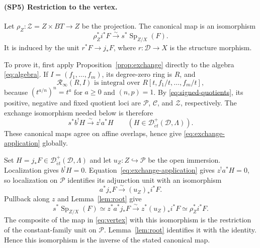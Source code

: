 \documentclass[11pt,a4paper]{article}
\newcommand{\Sp}{\operatorname{Sp}}
\newcommand{\Det}{\mathcal D_{\acute et}}
\newcommand{\cD}{\mathscr D}
\newcommand{\cC}{\mathscr C}
\newcommand{\cP}{\mathscr P}
\newcommand{\cZ}{\mathscr Z}
\newcommand{\Rinf}{\mathcal R_\infty}
\theoremstyle{notes}
\begin{document}
\paragraph{(SP5) Restriction to the vertex.}
Let $\rho_Z:\cZ=Z\times BT\to Z$ be the projection. The canonical map is an isomorphism
\begin{equation}\label{eq:vertex}
\boxed{\ \rho_Z^*i^*F\xrightarrow{\sim}s^*\Sp_{Z/X}(F).\ }
\end{equation}
It is induced by the unit $r^*F\to j_*F$, where $r:\cD\to X$ is the structure morphism.

To prove it, first apply Proposition~\ref{prop:exchange} directly to the algebra \eqref{eq:algebra}. If $I=(f_1,\ldots,f_m)$, its degree-zero ring is $R$, and
\[
\Rinf(R,I)\text{ is integral over }R[t,f_1/t,\ldots,f_m/t],
\]
because $(t^{a/n})^n=t^a$ for $a\geq0$ and $(n,p)=1$. By \eqref{eq:signed-quotients}, its positive, negative and fixed quotient loci are $\cP$, $\cC$, and $\cZ$, respectively. The exchange isomorphism needed below is therefore
\begin{equation}\label{eq:exchange-application}
s^*b^!H\xrightarrow{\sim}z^!a^*H
\qquad(H\in\Det^+(\cD,\Lambda)).
\end{equation}
These canonical maps agree on affine overlaps, hence give \eqref{eq:exchange-application} globally.

Set $H=j_*F\in\Det^+(\cD,\Lambda)$ and let $u_Z:Z\hookrightarrow\cP$ be the open immersion. Localization gives $b^!H=0$. Equation~\eqref{eq:exchange-application} gives $z^!a^*H=0$, so localization on $\cP$ identifies its adjunction unit with an isomorphism
\begin{equation}\label{eq:repeller}
a^*j_*F\xrightarrow{\sim}(u_Z)_*i^*F.
\end{equation}
Pullback along $z$ and Lemma~\ref{lem:root} give
\[
s^*\Sp_{Z/X}(F)\simeq z^*a^*j_*F
\xrightarrow{\sim}z^*(u_Z)_*i^*F\simeq\rho_Z^*i^*F.
\]
The composite of the map in \eqref{eq:vertex} with this isomorphism is the restriction of the constant-family unit on $\cP$. Lemma~\ref{lem:root} identifies it with the identity. Hence this isomorphism is the inverse of the stated canonical map.
\end{document}
